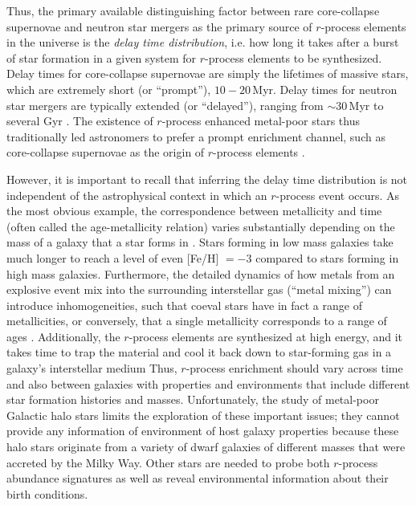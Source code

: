 \documentclass[letterpaper]{article}
\begin{document}
Thus, the primary available distinguishing factor between rare core-collapse supernovae and neutron star mergers as the primary source of $r$-process elements in the universe is the \emph{delay time distribution}, i.e. how long it takes after a burst of star formation in a given system for $r$-process elements to be synthesized.
Delay times for core-collapse supernovae are simply the lifetimes of massive stars, which are extremely short (or ``prompt''), $10-20$\,Myr.
Delay times for neutron star mergers are typically extended (or ``delayed''), ranging from ${\sim}30$\,Myr to several Gyr \citep[e.g.,][]{Belczynski2018,Neijssel2019}.
The existence of $r$-process enhanced metal-poor stars thus traditionally led astronomers to prefer a prompt enrichment channel, such as core-collapse supernovae as the origin of $r$-process elements \citep[e.g.,][]{Qian00,Argast04,wanajo_ishimaru}. 

However, it is important to recall that inferring the delay time distribution is not independent of the astrophysical context in which an $r$-process event occurs.
As the most obvious example, the correspondence between metallicity and time (often called the age-metallicity relation) varies substantially depending on the mass of a galaxy that a star forms in \citep[e.g.,][]{Ishimaru15,Ji2016b}. Stars forming in low mass galaxies take much longer to reach a level of even [Fe/H] $= -3$ compared to stars forming in high mass galaxies.
Furthermore, the detailed dynamics of how metals from an explosive event mix into the surrounding interstellar gas (``metal mixing'') can introduce inhomogeneities, such that coeval stars have in fact a range of metallicities, or conversely, that a single metallicity corresponds to a range of ages \citep[e.g.,][]{Webster14,Emerick2019,Ji2022}.
Additionally, the $r$-process elements are synthesized at high energy, and it takes time to trap the material and cool it back down to star-forming gas in a galaxy's interstellar medium \citep{Shen2015,Hirai15,Naiman2018,Schonrich2019,Cote2019,Naidu2022,Amend2022,vandeVoort2020,vandeVoort2022}
Thus, $r$-process enrichment should vary across time and also between galaxies with properties and environments that include different star formation histories and masses.
Unfortunately, the study of metal-poor Galactic halo stars limits the exploration of these important issues; they cannot provide any information of environment of host galaxy properties because these halo stars originate from a variety of dwarf galaxies of different masses that were accreted by the Milky Way. Other stars are needed to probe both $r$-process abundance signatures as well as reveal environmental information about their birth conditions.
\end{document}
